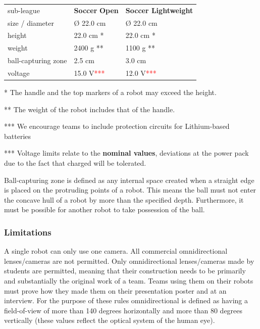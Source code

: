 \documentclass{article}
\begin{document}
\begin{table}
\begin{tabularx}{\textwidth}{
p{}
p{}
p{}}
sub-league & \textbf{Soccer} \textbf{Open} & \textbf{Soccer Lightweight} \\
size / diameter & \O{} 22.0 cm & \O{} 22.0 cm \\
height & 22.0 cm * & 22.0 cm * \\
weight & 2400 g ** & 1100 g ** \\
ball-capturing zone & 2.5 cm & 3.0 cm \\
voltage & 15.0 V\textcolor{red}{***} & 12.0 V\textcolor{red}{***} \\

\end{tabularx}

\end{table}

* The handle and the top markers of a robot may exceed the height.

** The weight of the robot includes that of the handle.

*** We encourage teams to include protection circuits for Lithium-based
batteries

*** Voltage limits relate to the \textbf{nominal values}, deviations at the power pack
due to the fact that charged will be tolerated.

Ball-capturing zone is defined as any internal space created when a straight
edge is placed on the protruding points of a robot. This means the ball must
not enter the concave hull of a robot by more than the specified depth.
Furthermore, it must be possible for another robot to take possession of the
ball.

\subsubsection{Limitations\label{ref-056}}

A single robot can only use one camera. All commercial omnidirectional
lenses/cameras are not permitted. Only omnidirectional lenses/cameras made by
students are permitted, meaning that their construction needs to be primarily
and substantially the original work of a team. Teams using them on their robots
must prove how they made them on their presentation poster and at an interview.
For the purpose of these rules omnidirectional is defined as having a
field-of-view of more than 140 degrees horizontally and more than 80 degrees
vertically (these values reflect the optical system of the human eye).
\end{document}
